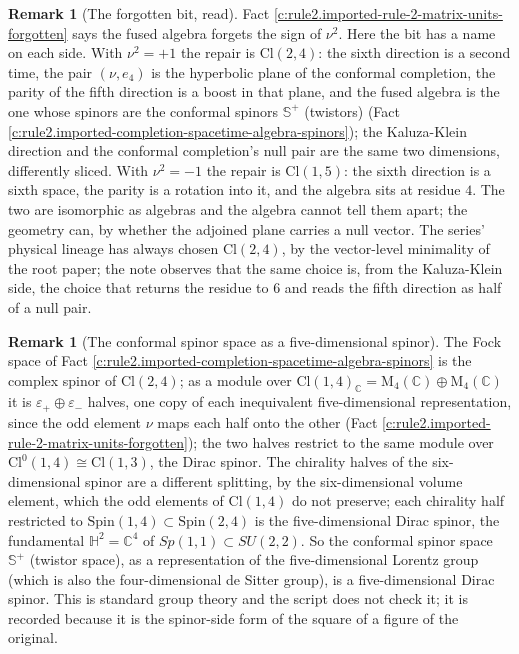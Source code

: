 \documentclass[11pt]{article}
\theoremstyle{definition}
\newtheorem{remark}[theorem]{Remark}
\theoremstyle{plain}
\providecommand{\C}{}\renewcommand{\C}{\mathbb{C}}
\providecommand{\CS}{}\renewcommand{\CS}{{\mathbb{S}^{+}}}
\providecommand{\Cl}{}\renewcommand{\Cl}{\mathrm{Cl}}
\providecommand{\HH}{}\renewcommand{\HH}{\mathbb{H}}
\providecommand{\Mat}{}\renewcommand{\Mat}{\mathrm{M}}
\begin{document}
\begin{remark}[The forgotten bit, read]\label{c:note.rule2.forgotten-bit-read}
Fact \ref{c:rule2.imported-rule-2-matrix-units-forgotten} says the fused algebra forgets the sign of $\nu^2$. Here the bit has a name on each side. With $\nu^2 = +1$ the repair is $\Cl(2,4)$: the sixth direction is a second time, the pair $(\nu, e_4)$ is the hyperbolic plane of the conformal completion, the parity of the fifth direction is a boost in that plane, and the fused algebra is the one whose spinors are the conformal spinors $\CS$ (twistors) (Fact \ref{c:rule2.imported-completion-spacetime-algebra-spinors}); the Kaluza-Klein direction and the conformal completion's null pair are the same two dimensions, differently sliced. With $\nu^2 = -1$ the repair is $\Cl(1,5)$: the sixth direction is a sixth space, the parity is a rotation into it, and the algebra sits at residue $4$. The two are isomorphic as algebras and the algebra cannot tell them apart; the geometry can, by whether the adjoined plane carries a null vector. The series' physical lineage has always chosen $\Cl(2,4)$, by the vector-level minimality of the root paper; the note observes that the same choice is, from the Kaluza-Klein side, the choice that returns the residue to $6$ and reads the fifth direction as half of a null pair.
\end{remark}

\begin{remark}[The conformal spinor space as a five-dimensional spinor]\label{c:note.rule2.twistor-five-dimensional-spinor}
The Fock space of Fact \ref{c:rule2.imported-completion-spacetime-algebra-spinors} is the complex spinor of $\Cl(2,4)$; as a module over $\Cl(1,4)_\C = \Mat_4(\C) \oplus \Mat_4(\C)$ it is $\varepsilon_+ \oplus \varepsilon_-$ halves, one copy of each inequivalent five-dimensional representation, since the odd element $\nu$ maps each half onto the other (Fact \ref{c:rule2.imported-rule-2-matrix-units-forgotten}); the two halves restrict to the same module over $\Cl^0(1,4) \cong \Cl(1,3)$, the Dirac spinor. The chirality halves of the six-dimensional spinor are a different splitting, by the six-dimensional volume element, which the odd elements of $\Cl(1,4)$ do not preserve; each chirality half restricted to $\mathrm{Spin}(1,4) \subset \mathrm{Spin}(2,4)$ is the five-dimensional Dirac spinor, the fundamental $\HH^2 = \C^4$ of $Sp(1,1) \subset SU(2,2)$. So the conformal spinor space $\CS$ (twistor space), as a representation of the five-dimensional Lorentz group (which is also the four-dimensional de Sitter group), is a five-dimensional Dirac spinor. This is standard group theory and the script does not check it; it is recorded because it is the spinor-side form of the square of a figure of the original.
\end{remark}
\end{document}
